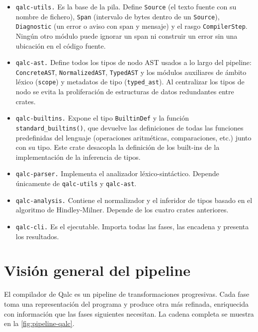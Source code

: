 \begin{itemize}
  \item \texttt{qalc-utils.} Es la base de la pila. Define \lstinline|Source| (el texto fuente con su nombre de fichero), \lstinline|Span| (intervalo de bytes dentro de un \lstinline|Source|), \lstinline|Diagnostic| (un error o aviso con span y mensaje) y el rasgo \lstinline|CompilerStep|. Ningún otro módulo puede ignorar un span ni construir un error sin una ubicación en el código fuente.

  \item \texttt{qalc-ast.} Define todos los tipos de nodo AST usados a lo largo del pipeline: \lstinline|ConcreteAST|, \lstinline|NormalizedAST|, \lstinline|TypedAST| y los módulos auxiliares de ámbito léxico (\lstinline|scope|) y metadatos de tipo (\lstinline|typed_ast|). Al centralizar los tipos de nodo se evita la proliferación de estructuras de datos redundantes entre crates.

  \item \texttt{qalc-builtins.} Expone el tipo \lstinline|BuiltinDef| y la función \lstinline|standard_builtins()|, que devuelve las definiciones de todas las funciones predefinidas del lenguaje (operaciones aritméticas, comparaciones, etc.) junto con su tipo. Este crate desacopla la definición de los built-ins de la implementación de la inferencia de tipos.

  \item \texttt{qalc-parser.} Implementa el analizador léxico-sintáctico. Depende únicamente de \lstinline|qalc-utils| y \lstinline|qalc-ast|.

  \item \texttt{qalc-analysis.} Contiene el normalizador y el inferidor de tipos basado en el algoritmo de Hindley-Milner. Depende de los cuatro crates anteriores.

  \item \texttt{qalc-cli.} Es el ejecutable. Importa todas las fases, las encadena y presenta los resultados.
\end{itemize}

\section{Visión general del pipeline}

El compilador de Qalc es un pipeline de transformaciones progresivas. Cada fase toma una representación del programa y produce otra más refinada, enriquecida con información que las fases siguientes necesitan. La cadena completa se muestra en la \autoref{fig:pipeline-qalc}.


